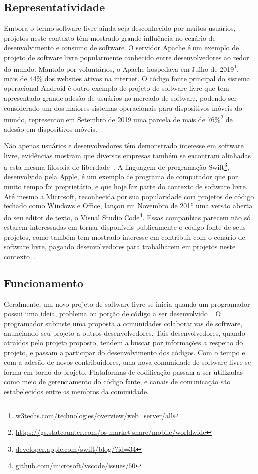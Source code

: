 \subsection{Representatividade}
Embora o termo software livre ainda seja desconhecido por muitos usuários, projetos neste contexto têm mostrado grande influência no cenário de desenvolvimento e consumo de software. O servidor Apache é um exemplo de projeto de software livre popularmente conhecido entre desenvolvedores ao redor do mundo. Mantido por voluntários, o Apache hospedava em Julho de 2019\footnote{\url{w3techs.com/technologies/overview/web_server/all}}, mais de 44$\%$ dos websites ativos na internet. O código fonte principal do sistema operacional Android é outro exemplo de projeto de software livre que tem apresentado grande adesão de usuários no mercado de software, podendo ser considerado um dos maiores sistemas operacionais para dispositivos móveis do mundo, representou em Setembro de 2019 uma parcela de mais de 76$\%$\footnote{\url{https://gs.statcounter.com/os-market-share/mobile/worldwide}} de adesão em dispositivos móveis.

Não apenas usuários e desenvolvedores têm demonstrado interesse em software livre, evidências mostram que diversas empresas também se encontram alinhadas a esta mesma filosofia de liberdade~\citep{pinto2018challenges}. A linguagem de programação Swift\footnote{\url{developer.apple.com/swift/blog/?id=34}}, desenvolvida pela Apple, é um exemplo de programa de computador que por muito tempo foi proprietário, e que hoje faz parte do contexto de software livre. Até mesmo a Microsoft, reconhecida por sua popularidade com projetos de código fechado como Windows e Office, lançou em Novembro de 2015 uma versão aberta do seu editor de texto, o Visual Studio Code\footnote{\url{github.com/microsoft/vscode/issues/60}}. Essas companhias parecem não só estarem interessadas em tornar disponíveis publicamente o código fonte de seus projetos, como também tem mostrado interesse em contribuir com o cenário de software livre, pagando desenvolvedores para trabalharem em projetos neste contexto~\citep{pinto2018gets}.

\subsection{Funcionamento}
Geralmente, um novo projeto de software livre se inicia quando um programador possui uma ideia, problema ou porção de código a ser desenvolvido~\citep{raymond1999cathedral}. O programador submete uma proposta a comunidades colaborativas de software, anunciando seu projeto a outros desenvolvedores. Tais desenvolvedores, quando atraídos pelo projeto proposto, tendem a buscar por informações a respeito do projeto, e passam a participar do desenvolvimento dos códigos. Com o tempo e com a adesão de novos contribuidores, uma nova comunidade de software livre se forma em torno do projeto. Plataformas de codificação passam a ser utilizadas como meio de gerenciamento do código fonte, e canais de comunicação são estabelecidos entre os membros da comunidade. 

